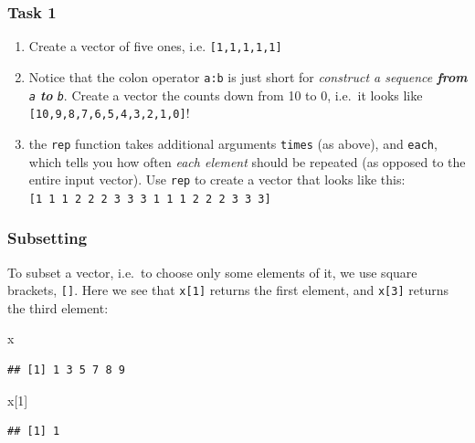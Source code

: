 \documentclass[]{book}
\newenvironment{Shaded}{\begin{snugshade}}{\end{snugshade}}
\newcommand{\DecValTok}[1]{\textcolor[rgb]{0.00,0.00,0.81}{#1}}
\newcommand{\NormalTok}[1]{#1}
\providecommand{\tightlist}{%
  \setlength{\itemsep}{0pt}\setlength{\parskip}{0pt}}
\begin{document}
\subsubsection{Task 1}\label{task-1}

\begin{enumerate}
\def\labelenumi{\arabic{enumi}.}
\tightlist
\item
  Create a vector of five ones, i.e. \texttt{{[}1,1,1,1,1{]}}
\item
  Notice that the colon operator \texttt{a:b} is just short for
  \emph{construct a sequence \textbf{from} \texttt{a} \textbf{to}
  \texttt{b}}. Create a vector the counts down from 10 to 0, i.e.~it
  looks like \texttt{{[}10,9,8,7,6,5,4,3,2,1,0{]}}!
\item
  the \texttt{rep} function takes additional arguments \texttt{times}
  (as above), and \texttt{each}, which tells you how often \emph{each
  element} should be repeated (as opposed to the entire input vector).
  Use \texttt{rep} to create a vector that looks like this:
  \texttt{{[}1\ 1\ 1\ 2\ 2\ 2\ 3\ 3\ 3\ 1\ 1\ 1\ 2\ 2\ 2\ 3\ 3\ 3{]}}
\end{enumerate}

\subsubsection{Subsetting}\label{subsetting}

To subset a vector, i.e.~to choose only some elements of it, we use
square brackets, \texttt{{[}{]}}. Here we see that \texttt{x{[}1{]}}
returns the first element, and \texttt{x{[}3{]}} returns the third
element:

\begin{Shaded}
\begin{Highlighting}[]
\NormalTok{x}
\end{Highlighting}
\end{Shaded}

\begin{verbatim}
## [1] 1 3 5 7 8 9
\end{verbatim}

\begin{Shaded}
\begin{Highlighting}[]
\NormalTok{x[}\DecValTok{1}\NormalTok{]}
\end{Highlighting}
\end{Shaded}

\begin{verbatim}
## [1] 1
\end{verbatim}
\end{document}
